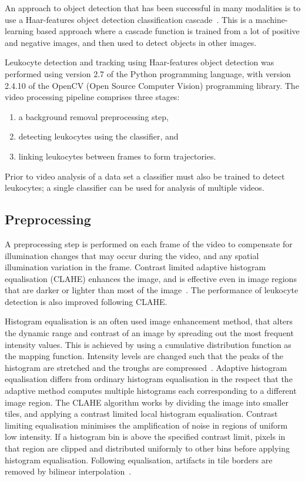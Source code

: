 An approach to object detection that has been successful in many modalities is to use a Haar-features object detection classification cascade~\cite{Lienhart2002}. This is a machine-learning based approach where a cascade function is trained from a lot of positive and negative images, and  then used to detect objects in other images. 

Leukocyte detection and tracking using Haar-features object detection was performed using version 2.7 of the Python programming language, with version 2.4.10 of the OpenCV (Open Source Computer Vision) programming library. The video processing pipeline comprises three stages: 
\begin{enumerate}
\item a background removal preprocessing step,
\item detecting leukocytes using the classifier, and 
\item linking leukocytes between frames to form trajectories.
\end{enumerate}
Prior to video analysis of a data set a classifier must also be trained to detect leukocytes; a single classifier can be used for analysis of multiple videos.

\subsection{Preprocessing}
\label{leukocytes:processing:preprocessing}
A preprocessing step is performed on each frame of the video to compensate for illumination changes that may occur during the video, and any spatial illumination variation in the frame. Contrast limited adaptive histogram equalisation (CLAHE) enhances the image, and is effective even in image regions that are darker or lighter than most of the image~\cite{Ketcham1974}. The performance of leukocyte detection is also improved following CLAHE.

Histogram equalisation is an often used image enhancement method, that alters the dynamic range and contrast of an image by spreading out the most frequent intensity values. This is achieved by using a cumulative distribution function as the mapping function. Intensity levels are changed such that the peaks of the histogram are stretched and the troughs are compressed~\cite{Sasi2013}. Adaptive histogram equalisation differs from ordinary histogram equalisation in the respect that the adaptive method computes multiple histograms each corresponding to a different image region. The CLAHE algorithm works by dividing the image into smaller tiles, and applying a contrast limited local histogram equalisation. Contrast limiting equalisation minimises the amplification of noise in regions of uniform low intensity. If a histogram bin is above the specified contrast limit, pixels in that region are clipped and distributed uniformly to other bins before applying histogram equalisation. Following equalisation, artifacts in tile borders are removed by bilinear interpolation~\cite{Hummel1977}.

